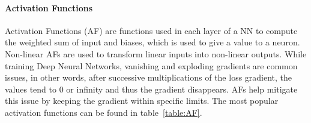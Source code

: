 \paragraph{Activation Functions}

Activation Functions (AF) are functions used in each layer of a NN
to compute the weighted sum of input and biases, which is used to give a value
to a neuron. Non-linear AFs are used to transform linear inputs into non-linear
outputs.  While training Deep Neural Networks, vanishing and exploding
gradients are common issues, in other words, after successive multiplications
of the loss gradient, the values tend to 0 or infinity and thus the
gradient disappears. AFs help mitigate this issue by keeping the gradient within
specific limits. The most popular activation functions can be found in
table~\ref{table:AF}.

\begin{table}[]
    \centering
    \resizebox{.6\textwidth}{!}{%
    \begin{tabular}{ll}
    \hline
    \textbf{Activation Functions} & \textbf{Computation Equation} \\ \hline \hline
    Sigmoid                       &  $\displaystyle f(x)=\frac{1}{1+ e^{-x}}$                             \\ \hline
    Tanh                          &  $\displaystyle f(x)=\frac{e^{x}-e^{-x}}{e^{x}+e^{-x}}$                            \\ \hline
    Softmax                       &  $\displaystyle f(x_{i})=\frac{x_{i}}{\sum_{j}e^{x_{j}}}$                             \\ \hline
    ReLU                          &    $ f(x)=\begin{matrix}
        x & if & x\geq 0  \\ 
        0 & if & x< 0 
    \end{matrix} $                           \\ \hline
    LReLU                         &  $f(x)= \begin{matrix}
        x & if & x > 0  \\ 
        \alpha x & if & x \leq 0 
    \end{matrix} $                        \\ \hline
    ELU                           &             $ f(x)=\begin{matrix}
        x & if & x> 0  \\ 
        \alpha e^{x} - 1 & if & x\leq 0 
    \end{matrix} $                 \\ \hline
    \end{tabular}%
    }
    \caption{Popular activation functions}
    \label{table:AF}
\end{table}


